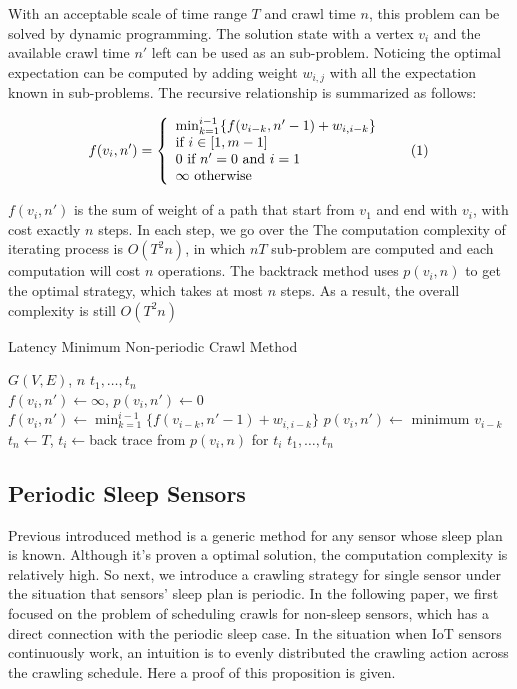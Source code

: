 \documentclass[conference]{IEEEtran}
\newcommand\numberthis{\addtocounter{equation}{1}\tag{\theequation}}
\begin{document}
With an acceptable scale of time range $T$ and crawl time $n$, this problem can be solved by dynamic programming. The solution state with a vertex $v_i$ and the available crawl time $n'$ left can be used as an sub-problem. Noticing the optimal expectation can be computed by adding weight $w_{i,j}$ with all the expectation known in sub-problems. The recursive relationship is summarized as follows:

\[f(v_i, n')=\left\{
\begin{array}{lr}
\min_{k=1}^{i-1}\{f(v_{i-k}, n'-1)+w_{i,i-k}\}\\
\text{if }i\in[1, m-1]\\
0\text{ if }n'=0\text{ and }i=1\\
\infty\text{ otherwise}
\end{array}\numberthis \label{dp}
\right.
\]


$f(v_i,n')$ is the sum of weight of a path that start from $v_1$ and end with $v_i$, with cost exactly $n$ steps. In each step, we go over the  The computation complexity of iterating process is $O(T^2n)$, in which $nT$ sub-problem are computed and each computation will cost $n$ operations. The backtrack method uses $p(v_i, n)$ to get the optimal strategy, which takes at most $n$ steps. As a result, the overall complexity is still $O(T^2n)$ 

\begin{algorithm}
	\caption{Latency Minimum Non-periodic Crawl Method}
	\label{alg:dp_min}
	\begin{algorithmic}[1]
		\renewcommand{\algorithmicrequire}{\textbf{Input:}}
		\renewcommand{\algorithmicensure}{\textbf{Output:}}
		\REQUIRE $G(V,E)$, $n$
		\ENSURE  $t_1,\ldots,t_n$
		\\
		\STATE $f(v_i,n') \gets \infty$, $p(v_i,n')\gets 0$
		\STATE $f(v_i,n')\gets\min_{k=1}^{i-1}\{f(v_{i-k}, n'-1)+w_{i,i-k}\}$
		\STATE $p(v_i,n')\gets$ minimum $v_{i-k}$
		\ENDFOR
		\ENDFOR
		\STATE $t_n\gets T$, $t_i\gets$back trace from $p(v_i, n)$ for $t_i$
		\RETURN $t_1,\ldots,t_n$
	\end{algorithmic}
\end{algorithm}


\subsection{Periodic Sleep Sensors}

Previous introduced method is a generic method for any sensor whose sleep plan is known. Although it's proven a optimal solution, the computation complexity is relatively high.
So next, we introduce a crawling strategy for single sensor under the situation that sensors' sleep plan is periodic.
In the following paper, we first focused on the problem of scheduling crawls for non-sleep sensors, which has a direct connection with the periodic sleep case.
In the situation when IoT sensors continuously work, an intuition is to evenly distributed the crawling action across the crawling schedule. Here a proof of this proposition is given.
\end{document}
